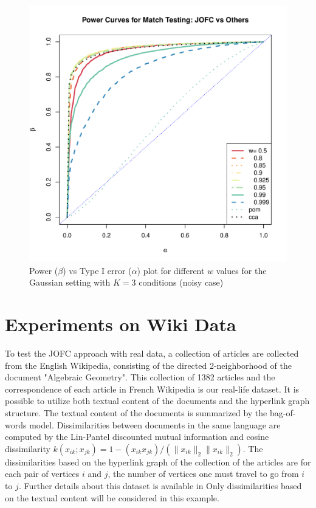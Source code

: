 \documentclass[12pt,oneside,final]{thesis}\usepackage[]{graphicx}\usepackage[]{color}
\begin{document}
 



\begin{figure}
\includegraphics[scale=0.95]{MVN-FC-Tradeoff-OOS-3cond.pdf}
\caption{Power ($\beta$) vs Type I error ($\alpha$) plot for different $w$ values for the Gaussian setting with $K=3$ conditions (noisy case)}
\label{fig:MVN-c001-power-w-Kcond}
\end{figure}



\section{Experiments on Wiki Data}
To test the JOFC approach with real data, a collection of articles are collected from the English Wikipedia, consisting of the
 directed 2-neighborhood of the document "Algebraic Geometry". 
   This  collection of 1382 articles and the correspondence of each article in French 
Wikipedia is our real-life dataset. It is possible to utilize both textual content of the documents and the hyperlink graph structure. The textual content of the documents is summarized by the bag-of-words model. Dissimilarities between documents  in the same language are computed by the Lin-Pantel discounted mutual information \cite{LinPantel,PantelLin}
 and cosine dissimilarity $k(x_{ik}; x_{jk}) = 1 - (x_{ik} x_{jk})/(\|x_{ik}\|_2\|x_{ik}\|_2)$. 
 The dissimilarities based on the hyperlink graph of the collection of the articles are 
 for each pair of vertices $i$ and $j$, the number of vertices one must travel to go from $i$ to $j$.  Further details about this dataset is available in \cite{Zhiliang_disparate}     
Only  dissimilarities based on the textual content will be considered in this example.
   
\end{document}
